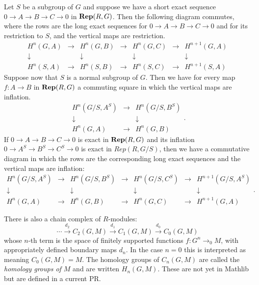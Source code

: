 \begin{lemma} \label{lem:inflation restriction naturality}
	\leanok
	Let $S$ be a subgroup of $G$ and suppose we have a short exact sequence
	$0 \to A \to B \to C \to 0$ in $\mathbf{Rep}(R,G)$.
	Then the following diagram commutes, where the rows are the long exact sequences
	for $0 \to A \to B \to C \to 0$ and for its restriction to $S$,
	and the vertical maps are restriction.
	\[
  	\begin{array}{ccccccc}
			H^n(G,A) & \to & H^n(G,B) &\to &H^n(G,C)& \to& H^{n+1}(G,A)\\
			\downarrow&&\downarrow&&\downarrow&&\downarrow \\
			H^n(S,A) & \to & H^n(S,B) &\to &H^n(S,C)& \to& H^{n+1}(S,A)
		\end{array}
  \]
	Suppose now that $S$ is a normal subgroup of $G$. Then we have for every
	map $f : A \to B$ in $\mathbf{Rep}(R,G)$ a commuting square in which the vertical maps are inflation.
	\[
  	\begin{array}{ccccccc}
			H^n(G/S,A^S) & \to & H^n(G/S,B^S)\\
			\downarrow&&\downarrow \\
			H^n(G,A) & \to & H^n(G,B)
		\end{array}.
	\]
	If $0 \to A \to B \to C \to 0$ is exact in $\mathbf{Rep}(R,G)$ and its inflation
	$0 \to A^S \to B^S \to C^S \to 0$ is exact in $Rep(R,G/S)$, then
	we have a commutative diagram in which the rows are the corresponding long exact
	sequences and the vertical maps are inflation:
	\[
  	\begin{array}{ccccccc}
			H^n(G/S,A^S) & \to & H^n(G/S,B^S) &\to &H^n(G/S,C^S)& \to& H^{n+1}(G/S,A^S)\\
			\downarrow&&\downarrow&&\downarrow&&\downarrow \\
			H^n(G,A) & \to & H^n(G,B) &\to &H^n(G,C)& \to& H^{n+1}(G,A)
		\end{array}.
  \]
\end{lemma}

\begin{definition} \label{def:group homology}
	There is also a chain complex of $R$-modules:
	\[
		\cdots \stackrel{d_2}\to C_2(G,M) \stackrel{d_1}\to C_1(G,M) \stackrel{d_0}\to C_0(G,M)
	\]
	whose $n$-th term is the space of finitely supported functions
	$f : G^n \to_0 M$, with appropriately defined boundary maps $d_n$.
	In the case $n=0$ this is interpreted as meaning $C_0(G,M) = M$.
	The homology groups of $C_n(G,M)$ are called the \emph{homology groups of $M$}
	and are written $H_n(G,M)$.
	These are not yet in Mathlib but are defined in a current PR.
\end{definition}

